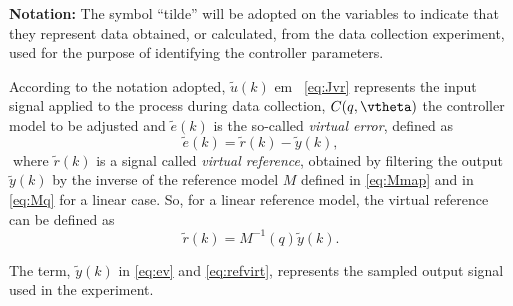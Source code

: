 \textbf{Notation:} The symbol ``tilde'' will be adopted on the variables to indicate that they represent data obtained, or calculated, from the data collection experiment, used for the purpose of identifying the controller parameters.

According to the notation adopted, $\tilde{u}(k)$ em ~\eqref{eq:Jvr} represents the input signal applied to the process during data collection, $C (q,\vtheta)$ the controller model to be adjusted and $\tilde{e}(k)$ is the so-called \textit{virtual error}, defined as
\begin{equation}
   \tilde{e}(k) = \tilde{r}(k) - \tilde{y}(k) 
   \label{eq:ev},
\end{equation}
where $\tilde{r}(k)$ is a signal called \textit{virtual reference}, obtained by filtering the output $\tilde{y}(k)$ by the inverse of the reference model $M$ defined in  \eqref{eq:Mmap} and in \eqref{eq:Mq} for a linear case. So, for a linear reference model, the virtual reference can be defined as
\begin{equation}
   \tilde{r}(k) = M^{-1}(q){\tilde{y}}(k)
   \label{eq:refvirt}.
\end{equation}

The term, $\tilde{y}(k)$ in \eqref{eq:ev} and \eqref{eq:refvirt}, represents the sampled output signal used in the experiment.

